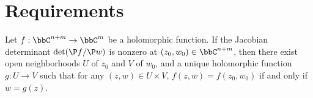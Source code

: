 \section{Requirements}

\begin{theorem}\label{thm:holomorphic_implicit_function_theorem}
    Let \(f: \bbC^{n+m} \to \bbC^m\) be a holomorphic function. If the Jacobian determinant \(\det(\P f/\P w)\) is nonzero at \((z_0, w_0) \in \bbC^{n+m}\), then there exist open neighborhoods \(U\) of \(z_0\) and \(V\) of \(w_0\), and a unique holomorphic function \(g: U \to V\) such that for any \((z, w) \in U \times V\), \(f(z, w) = f(z_0, w_0)\) if and only if \(w = g(z)\).
\end{theorem}
